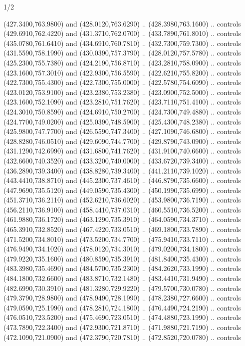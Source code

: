 \begin{flagdescription}{1/2}
\begin{scope}[xshift=0.5\flaglength]
\begin{scope}[scale=0.00745\flagwidth,xshift=-12.1mm,yshift=41.7mm]
\begin{scope}[y=0.80pt, x=0.80pt, yscale=-1, xscale=1, inner sep=0pt, outer sep=0pt]
\begin{scope}[cm={{1.33333,0.0,0.0,-1.33333,(0.0,114.66667)}}]
\begin{scope}[scale=0.100]
  (427.3400,763.9800) and (428.0120,763.6290) .. (428.3980,763.1600) .. controls
  (429.6910,762.4220) and (431.3710,762.0700) .. (433.7890,761.8010) .. controls
  (435.0780,761.6410) and (434.6910,760.7810) .. (432.7300,759.7300) .. controls
  (431.5590,758.1990) and (430.0390,757.3790) .. (428.0120,757.5780) .. controls
  (425.2300,755.7380) and (424.2190,756.8710) .. (423.2810,758.0900) .. controls
  (423.1600,757.3010) and (422.9300,756.5590) .. (422.6210,755.8200) .. controls
  (422.7300,755.4300) and (422.7300,755.0000) .. (422.5780,754.6090) .. controls
  (423.0120,753.9100) and (423.2380,753.2380) .. (423.0900,752.5000) .. controls
  (423.1600,752.1090) and (423.2810,751.7620) .. (423.7110,751.4100) .. controls
  (424.3010,750.8590) and (424.6910,750.2700) .. (424.7300,749.4880) .. controls
  (424.7700,749.0200) and (425.0390,748.5900) .. (425.4300,748.2380) .. controls
  (425.9800,747.7700) and (426.5590,747.3400) .. (427.1090,746.6800) .. controls
  (428.8280,746.0510) and (429.6090,744.7700) .. (429.8790,743.0900) .. controls
  (431.1290,742.6990) and (431.6800,741.7620) .. (431.9100,740.6600) .. controls
  (432.6600,740.3520) and (433.3200,740.0000) .. (433.6720,739.3400) .. controls
  (436.2890,739.3400) and (438.8280,739.3400) .. (441.2110,739.1020) .. controls
  (443.4410,738.8710) and (445.2300,737.4610) .. (446.8790,735.6600) .. controls
  (447.9690,735.5120) and (449.0590,735.4300) .. (450.1990,735.6990) .. controls
  (451.3710,736.2110) and (452.6210,736.6020) .. (453.9800,736.7190) .. controls
  (456.2110,736.9100) and (458.4410,737.0310) .. (460.5510,736.5200) .. controls
  (461.9880,736.1720) and (463.1290,735.3910) .. (464.0590,734.3710) .. controls
  (465.3910,732.8520) and (467.4220,733.0510) .. (469.1800,733.7890) .. controls
  (471.5200,734.8010) and (473.5200,734.7700) .. (475.9410,733.7110) .. controls
  (476.9490,734.1020) and (478.0120,734.3010) .. (479.0200,734.1800) .. controls
  (479.9220,735.1600) and (480.8590,735.3910) .. (481.8400,735.4300) .. controls
  (483.3980,735.4690) and (484.5700,735.2300) .. (484.2620,733.1990) .. controls
  (484.1800,732.6600) and (483.8710,732.1480) .. (483.4410,731.9490) .. controls
  (482.6990,730.3910) and (481.3280,729.9220) .. (479.5700,730.0780) .. controls
  (479.3790,728.9800) and (478.9490,728.1990) .. (478.2380,727.6600) .. controls
  (479.0590,725.1990) and (478.2810,724.1800) .. (476.4490,724.2190) .. controls
  (476.0510,723.5200) and (475.4690,723.0510) .. (474.4880,723.1990) .. controls
  (473.7890,722.3400) and (472.9300,721.8710) .. (471.9880,721.7190) .. controls
  (472.1090,721.0900) and (472.3790,720.7810) .. (472.8520,720.0780) .. controls

\end{scope}
\end{scope}
\end{scope}
\end{scope}
\end{scope}
\end{flagdescription}
